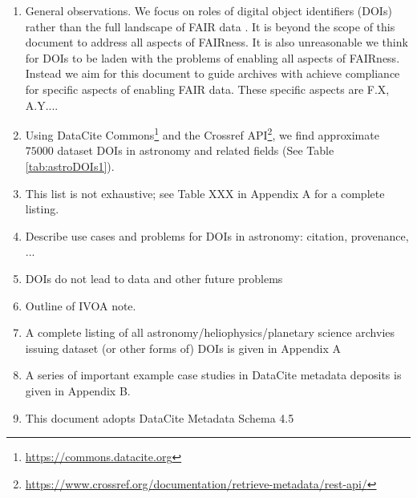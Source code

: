 \documentclass[11pt,a4paper]{ivoa}
\begin{document}
\begin{enumerate}
\item General observations. 
We focus on roles of digital object identifiers (DOIs) rather than the full landscape of FAIR data \citep[e.g.,][]{Wilkinson2016}. 
It is beyond the scope of this document to address all aspects of FAIRness.
It is also unreasonable we think for DOIs to be laden with the problems of enabling all aspects of FAIRness. 
Instead we aim for this document to guide archives with achieve compliance for specific aspects of enabling FAIR data.
These specific aspects are F.X, A.Y....
\item Using DataCite Commons\footnote{\url{https://commons.datacite.org}} and the Crossref API\footnote{\url{https://www.crossref.org/documentation/retrieve-metadata/rest-api/}}, we find approximate $75000$ dataset DOIs in astronomy and related fields (See Table \ref{tab:astroDOIs1}).
\item This list is not exhaustive; see Table XXX in Appendix A for a complete listing.
\item Describe use cases and problems for DOIs in astronomy: citation, provenance, ...
\item DOIs do not lead to data and other future problems
\item Outline of IVOA note.
\item A complete listing of all astronomy/heliophysics/planetary science archvies issuing dataset (or other forms of) DOIs is given in Appendix A
\item A series of important example case studies in DataCite metadata deposits is given in Appendix B.
\item This document adopts DataCite Metadata Schema 4.5 \citep{datacite_metadata_working_group_datacite_2024}
\end{enumerate}
\end{document}
